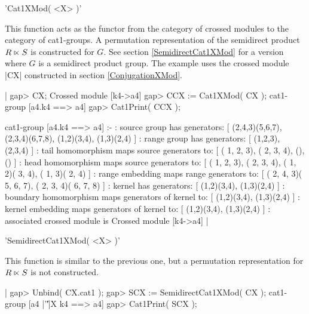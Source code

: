 'Cat1XMod( <X> )'

This function acts as the functor from the category of crossed modules
to the category of cat1-groups.  A permutation representation of the
semidirect product $R \semidirect S$  is constructed for $G$.
See section \ref{SemidirectCat1XMod} for a version where
$G$ is a semidirect product group.
The example uses the crossed module |CX| constructed in section
\ref{ConjugationXMod}.

|    gap> CX;
    Crossed module [k4->a4]
    gap> CCX := Cat1XMod( CX );
    cat1-group [a4.k4 ==> a4] 
    gap> Cat1Print( CCX );

    cat1-group [a4.k4 ==> a4] :- 
    : source group has generators:
      [ (2,4,3)(5,6,7), (2,3,4)(6,7,8), (1,2)(3,4), (1,3)(2,4) ]
    :  range group has generators:
      [ (1,2,3), (2,3,4) ]
    : tail homomorphism maps source generators to:
      [ ( 1, 2, 3), ( 2, 3, 4), (), () ]
    : head homomorphism maps source generators to:
      [ ( 1, 2, 3), ( 2, 3, 4), ( 1, 2)( 3, 4), ( 1, 3)( 2, 4) ]
    : range embedding maps range generators to:
      [ ( 2, 4, 3)( 5, 6, 7), ( 2, 3, 4)( 6, 7, 8) ]
    : kernel has generators:
      [ (1,2)(3,4), (1,3)(2,4) ]
    : boundary homomorphism maps generators of kernel to:
      [ (1,2)(3,4), (1,3)(2,4) ]
    : kernel embedding maps generators of kernel to:
      [ (1,2)(3,4), (1,3)(2,4) ]
    : associated crossed module is Crossed module [k4->a4]    |

%

'SemidirectCat1XMod( <X> )'

This function is similar to the previous one, but a permutation
representation for  $R \semidirect S$  is not constructed.

|    gap> Unbind( CX.cat1 );
    gap> SCX := SemidirectCat1XMod( CX );
    cat1-group [a4 |'\|'|X k4 ==> a4] 
    gap> Cat1Print( SCX );

